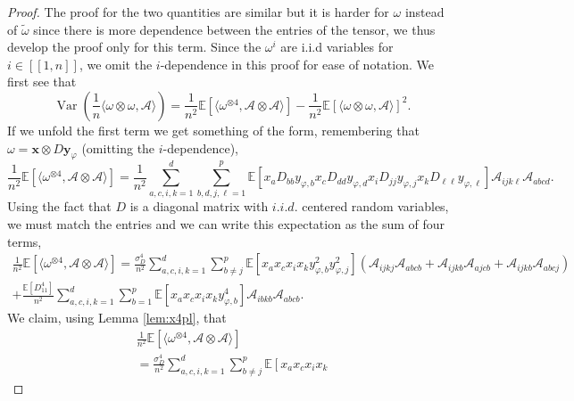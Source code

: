 \documentclass[letterpaper, 10pt, dvipsnames]{article}
\numberwithin{equation}{section}
\DeclareMathOperator{\Var}{Var}
\newcommand{\x}{\mathbf{x}}
\newcommand{\y}{\mathbf{y}}
\renewcommand{\phi}{\varphi}
\newcommand{\wt}{\widetilde}
\newcommand{\E}{\mathds{E}}
\newcommand{\unn}[2]{[\![#1,#2]\!]}
\theoremstyle{definition}
\begin{document}
  \begin{proof}
    The proof for the two quantities are similar but it is harder for $\omega$ instead of $\wt{\omega}$ since there is more dependence between the entries of the tensor, we thus develop the proof only for this term. Since the $\omega^i$ are i.i.d variables for $i\in\unn{1}{n}$, we omit the $i$-dependence in this proof for ease of notation. We first see that 
    \[
      \Var \left(
        \frac{1}{n}\langle \omega\otimes \omega,\mathcal{A}\rangle
      \right)
      =
      \frac{1}{n^2}
      \E\left[
        \langle \omega^{\otimes 4},\mathcal{A}\otimes \mathcal{A}\rangle
      \right]
      -
      \frac{1}{n^2}
      \E\left[
        \langle\omega\otimes \omega,\mathcal{A}\rangle
      \right]^2.
    \]
  If we unfold the first term we get something of the form, remembering that $\omega = \x\otimes D\y_{\phi}$ (omitting the $i$-dependence), 
  \[
    \frac{1}{n^2}
    \E\left[
        \langle \omega^{\otimes 4},\mathcal{A}\otimes \mathcal{A}\rangle
      \right]
    =
    \frac{1}{n^2} \sum_{a,c,i,k=1}^d \sum_{b,d,j,\ell=1}^p 
    \E\left[
      x_aD_{bb}y_{\phi,b}x_cD_{dd}y_{\phi,d}x_iD_{jj}y_{\phi,j}x_kD_{\ell\ell}y_{\phi,\ell}
    \right]
    \mathcal{A}_{ijk\ell}\mathcal{A}_{abcd}.
  \]
  Using the fact that $D$ is a diagonal matrix with $i.i.d.$ centered random variables, we must match the entries and we can write this expectation as the sum of four terms,
  \begin{multline}\label{eq:tensordevelop}
    \frac{1}{n^2}
    \E\left[
      \langle \omega^{\otimes 4},\mathcal{A}\otimes \mathcal{A}\rangle
    \right]
    =
    \frac{\sigma_D^4}{n^2}
    \sum_{a,c,i,k=1}^d
    \sum_{b\neq j}^p
    \E\left[
      x_ax_cx_{i}x_ky_{\phi,b}^2y_{\phi,j}^2
    \right]
    \left(
      \mathcal{A}_{ijkj}\mathcal{A}_{abcb}+\mathcal{A}_{ijkb}\mathcal{A}_{ajcb}+\mathcal{A}_{ijkb}\mathcal{A}_{ab cj}
    \right)\\
    +
    \frac{\E\left[D_{11}^4\right]}{n^2}
    \sum_{a,c,i,k=1}^d
    \sum_{b=1}^p
    \E\left[
      x_ax_cx_ix_k y_{\phi,b}^4
    \right]\mathcal{A}_{ibkb}\mathcal{A}_{abcb}.
  \end{multline}
  We claim,
  using Lemma \ref{lem:x4pl}, 
  that
  \begin{multline}\label{eq:tensordevelop2}
    \frac{1}{n^2}
    \E\left[
      \langle \omega^{\otimes 4},\mathcal{A}\otimes \mathcal{A}\rangle
    \right]
    \\=
    \frac{\sigma_D^4}{n^2}
    \sum_{a,c,i,k=1}^d
    \sum_{b\neq j}^p
    \E\left[
      x_ax_cx_{i}x_k

\end{multline}
\end{proof}
\end{document}
